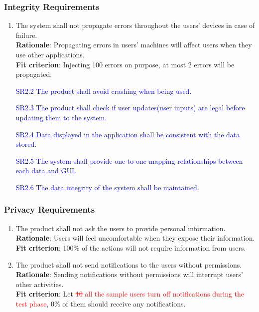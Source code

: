 \documentclass{article}
\begin{document}
\subsubsection{Integrity Requirements}
\begin{enumerate}[SR2.1]
    \item The system shall not propagate errors throughout the users' devices in case of failure.\\
    \textbf{Rationale}: Propagating errors in users' machines will affect
    users when they use other applications.\\
    \textbf{Fit criterion}: Injecting 100 errors on purpose, at most 2 errors
    will be propagated.
     \item[\textcolor{blue}{SR2.2}] \textcolor{blue}{The product shall avoid crashing when
      being used.}
    \item[\textcolor{blue}{SR2.3}] \textcolor{blue}{The product shall check if user
    updates(user inputs) are legal before updating them to the system.}
    \item[\textcolor{blue}{SR2.4}] \textcolor{blue}{Data displayed in the application shall
     be consistent with the data stored.}
    \item[\textcolor{blue}{SR2.5}] \textcolor{blue}{The system shall provide one-to-one
     mapping relationships between each data and GUI.}
    \item[\textcolor{blue}{SR2.6}] \textcolor{blue}{The data integrity of the system shall
     be maintained.}
\end{enumerate}
\subsubsection{Privacy Requirements}
\begin{enumerate}[SR3.1]
    \item The product shall not ask the users to provide personal information.\\
    \textbf{Rationale}: Users will feel uncomfortable when they expose their information.\\
    \textbf{Fit criterion}: 100\% of the actions will not require information from users.
    \item The product shall not send notifications to the users 
    without permissions.\\
    \textbf{Rationale}: Sending notifications without permissions will
    interrupt users' other activities.\\
    \textbf{Fit criterion}: Let \textcolor{red}{\st{10} all the sample users turn off notifications
    during the test phase}, 0\% of them should receive any notifications.\\
\end{enumerate}
\end{document}
